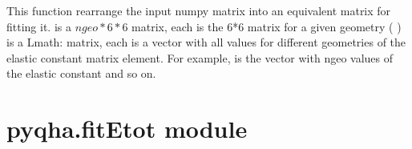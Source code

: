 \documentclass[letterpaper,10pt,english]{sphinxmanual}
\begin{document}

\begin{fulllineitems}
This function rearrange the input numpy matrix  into an equivalent matrix 
for fitting it.
 is a \(ngeo*6*6\) matrix, each  is the 6*6  matrix for a given geometry (  )
 is a Lmath: matrix, each  is a vector with all values for different
geometries of the  elastic constant matrix element. For example, 
is the vector with ngeo values of the  elastic constant and so on.

\end{fulllineitems}



\section{pyqha.fitEtot module}
\label{pyqha:pyqha-fitetot-module}\label{pyqha:module-pyqha.fitEtot}
\end{document}
